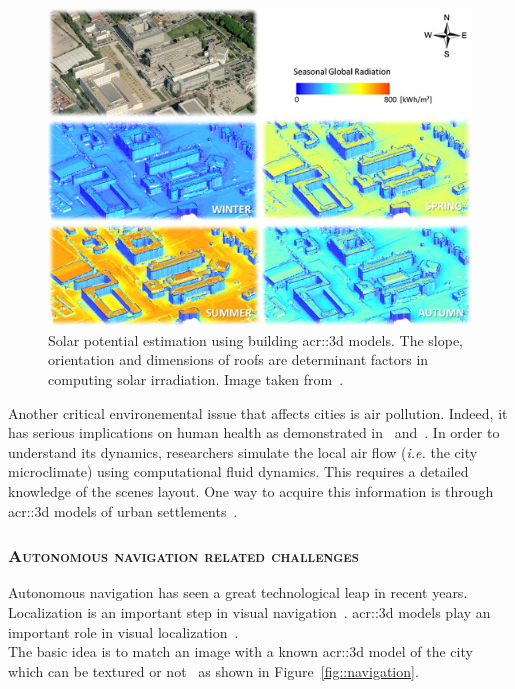             \begin{figure}[htpb]
                \centering
                \includegraphics[width=.7\textwidth]{images/introduction/3d_model_applications/solar_potential}
                \caption[
                    Solar potential estimation using building \acrshort*{acr::3d} models.
                ]{
                    \label{fig::solar_potential}
                    Solar potential estimation using building \gls{acr::3d} models.
                    The slope, orientation and dimensions of roofs are determinant factors in computing solar irradiation.
                    Image taken from~\parencite{redweik2013solar}.
                }
            \end{figure}

            Another critical environemental issue that affects cities is air pollution.
            Indeed, it has serious implications on human health as demonstrated in~\textcite{pascal2013assessing} and~\textcite{chen2013evidence}.
            In order to understand its dynamics, researchers simulate the local air flow (\textit{i.e.} the city microclimate) using computational fluid dynamics.
            This requires a detailed knowledge of the scenes layout.
            One way to acquire this information is through \gls{acr::3d} models of urban settlements~\parencite{ujang2013unified}.
       
        \subsubsection{\textsc{Autonomous navigation related challenges}}
            Autonomous navigation has seen a great technological leap in recent years.
            Localization is an important step in visual navigation~\parencite{bonin2008visual}.
            \Gls{acr::3d} models play an important role in visual localization~\parencite{piasco2018survey, ijgi4042842}.\\
            The basic idea is to match an image with a known \gls{acr::3d} model of the city which can be textured or not~\parencite{arth2015instant, ardeshir2014gis, cham2010estimating, christie2016semantics} as shown in Figure~\ref{fig::navigation}.

